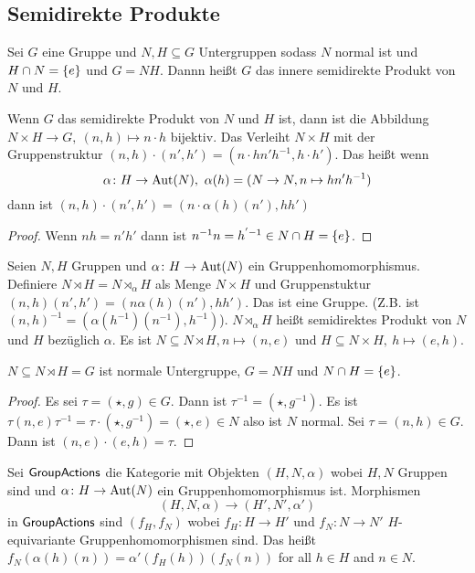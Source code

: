 \subsection{Semidirekte Produkte}
\begin{Def}
    Sei \(G\) eine Gruppe und \(N,H\subseteq  G\) Untergruppen sodass \(N\) normal ist und \(H\cap N=\{e\}\) und \(G=NH\). Dannn heißt \(G\) das innere semidirekte Produkt von \(N\) und \(H\).
\end{Def}
\begin{Bem}
    Wenn \(G\) das semidirekte Produkt von \(N\) und \(H\) ist, dann ist die Abbildung \(N\times H\to G,\ (n,h)\mapsto n\cdot h\) bijektiv. Das Verleiht \(N\times H\) mit der Gruppenstruktur \((n,h)\cdot (n',h')=(n\cdot hn'h^{-1},h\cdot h')\). Das heißt wenn \[\alpha\colon H\to\Aut(N),\ \alpha(h)=(N\to N, n\mapsto hn'h^{-1})\] dann ist \((n,h)\cdot(n',h')=(n\cdot\alpha(h)(n'),hh')\)
\end{Bem}
\begin{proof}
    Wenn \(nh=n'h'\) dann ist \(n^{-1}n=h^{'-1}\in N\cap H=\{e\}\).
\end{proof}
\begin{Def}
    Seien \(N,H\) Gruppen und \(\alpha\colon H\to\operatorname{Aut}(N)\) ein Gruppenhomomorphismus. Definiere \(N\rtimes H=N\rtimes_\alpha H\) als Menge \(N\times H\) und Gruppenstuktur \((n,h)(n',h')=(n\alpha(h)(n'),hh')\). Das ist eine Gruppe. (Z.B. ist \((n,h)^{-1}=(\alpha(h^{-1})(n^{-1}),h^{-1})\)). \(N\rtimes_\alpha H\) heißt semidirektes Produkt von \(N\) und \(H\) bezüglich \(\alpha\).
    Es ist \(N\subseteq N\rtimes H, n\mapsto (n,e)\) und \(H\subseteq N\times H,\ h\mapsto (e,h)\).
\end{Def}
\begin{Lemma}
    \(N\subseteq N\rtimes H=G\) ist normale Untergruppe, \(G=NH\) und \(N\cap H=\{e\}\).
\end{Lemma}
\begin{proof}
    Es sei \(\tau=(\star,g)\in G\). Dann ist \(\tau^{-1}=(\star,g^{-1})\).
    Es ist \(\tau(n,e)\tau^{-1}=\tau\cdot(\star,g^{-1})=(\star,e)\in N\) also ist \(N\) normal. 
    Sei \(\tau=(n,h)\in G\). Dann ist \((n,e)\cdot (e, h)=\tau\).
\end{proof}
\begin{Def}
    Sei \(\mathsf{GroupActions}\) die Kategorie mit Objekten \((H,N,\alpha)\) wobei \(H,N\) Gruppen sind und \(\alpha\colon H\to\operatorname{Aut}(N)\) ein Gruppenhomomorphismus ist. Morphismen \[(H,N,\alpha)\to (H',N',\alpha')\] in \(\mathsf{GroupActions}\) sind \((f_H,f_N)\) wobei \(f_H\colon H\to H'\)  und \(f_N\colon N\to N'\) \(H\)-equivariante Gruppenhomomorphismen sind. Das heißt
    \(f_N(\alpha(h)(n))=\alpha'(f_H(h))(f_N(n))\) for all \(h\in H\) and \(n\in N\).
\end{Def}
